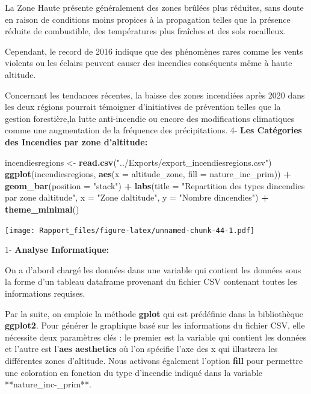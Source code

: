 \documentclass[
]{article}
\newenvironment{Shaded}{\begin{snugshade}}{\end{snugshade}}
\newcommand{\AttributeTok}[1]{\textcolor[rgb]{0.13,0.29,0.53}{#1}}
\newcommand{\FunctionTok}[1]{\textcolor[rgb]{0.13,0.29,0.53}{\textbf{#1}}}
\newcommand{\NormalTok}[1]{#1}
\newcommand{\OtherTok}[1]{\textcolor[rgb]{0.56,0.35,0.01}{#1}}
\newcommand{\SpecialCharTok}[1]{\textcolor[rgb]{0.81,0.36,0.00}{\textbf{#1}}}
\newcommand{\StringTok}[1]{\textcolor[rgb]{0.31,0.60,0.02}{#1}}
\begin{document}
La Zone Haute présente généralement des zones brûlées plus réduites,
sans doute en raison de conditions moins propices à la propagation
telles que la présence réduite de combustible, des températures plus
fraîches et des sols rocailleux.

Cependant, le record de 2016 indique que des phénomènes rares comme les
vents violents ou les éclairs peuvent causer des incendies conséquents
même à haute altitude.

Concernant les tendances récentes, la baisse des zones incendiées après
2020 dans les deux régions pourrait témoigner d'initiatives de
prévention telles que la gestion forestière,la lutte anti-incendie ou
encore des modifications climatiques comme une augmentation de la
fréquence des précipitations. 4- \textbf{Les Catégories des Incendies
par zone d'altitude:}

\begin{Shaded}
\begin{Highlighting}[]
\NormalTok{incendiesregions }\OtherTok{\textless{}{-}} \FunctionTok{read.csv}\NormalTok{(}\StringTok{"../Exports/export\_incendiesregions.csv"}\NormalTok{)}
\FunctionTok{ggplot}\NormalTok{(incendiesregions, }\FunctionTok{aes}\NormalTok{(}\AttributeTok{x =}\NormalTok{ altitude\_zone, }\AttributeTok{fill =}\NormalTok{ nature\_inc\_prim)) }\SpecialCharTok{+}
  \FunctionTok{geom\_bar}\NormalTok{(}\AttributeTok{position =} \StringTok{"stack"}\NormalTok{) }\SpecialCharTok{+}
  \FunctionTok{labs}\NormalTok{(}\AttributeTok{title =} \StringTok{"Repartition des types d\textquotesingle{}incendies par zone d\textquotesingle{}altitude"}\NormalTok{,}
       \AttributeTok{x =} \StringTok{"Zone d\textquotesingle{}altitude"}\NormalTok{, }\AttributeTok{y =} \StringTok{"Nombre d\textquotesingle{}incendies"}\NormalTok{) }\SpecialCharTok{+}
  \FunctionTok{theme\_minimal}\NormalTok{()}
\end{Highlighting}
\end{Shaded}

\texttt{[image: Rapport\_files/figure-latex/unnamed-chunk-44-1.pdf]}

1- \textbf{Analyse Informatique:}

On a d'abord chargé les données dans une variable qui contient les
données sous la forme d'un tableau dataframe provenant du fichier CSV
contenant toutes les informations requises.

Par la suite, on emploie la méthode \textbf{gplot} qui est prédéfinie
dans la bibliothèque \textbf{ggplot2}. Pour générer le graphique basé
sur les informations du fichier CSV, elle nécessite deux paramètres clés
: le premier est la variable qui contient les données et l'autre est
l'\textbf{aes aesthetics} où l'on spécifie l'axe des x qui illustrera
les différentes zones d'altitude. Nous activons également l'option
\textbf{fill} pour permettre une coloration en fonction du type
d'incendie indiqué dans la variable **nature\_inc-\_prim**.
\end{document}
